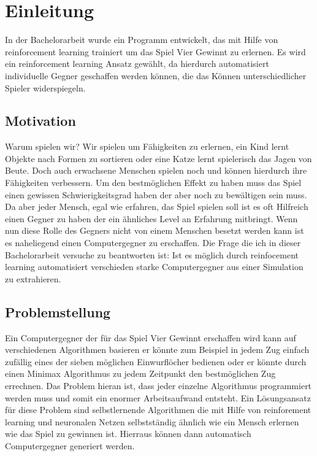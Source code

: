 \chapter{Einleitung}
\label{cha:Einleitung}

In der Bachelorarbeit wurde ein Programm entwickelt, das mit Hilfe von reinforcement learning trainiert um das Spiel Vier Gewinnt zu erlernen. 
Es wird ein reinforcement learning Ansatz gewählt, da hierdurch automatisiert individuelle Gegner geschaffen werden können, die das Können unterschiedlicher Spieler widerspiegeln.%


\section{Motivation}
Warum spielen wir? Wir spielen um Fähigkeiten zu erlernen, ein Kind lernt Objekte nach Formen zu sortieren oder eine Katze lernt spielerisch das Jagen von Beute. Doch auch erwachsene Menschen spielen noch und können hierdurch ihre Fähigkeiten verbessern.  Um den bestmöglichen Effekt zu haben muss das Spiel einen gewissen Schwierigkeitsgrad haben der aber noch zu bewältigen sein muss. Da aber jeder Mensch, egal wie erfahren, das Spiel spielen soll ist es oft Hilfreich einen Gegner zu haben der ein ähnliches Level an Erfahrung mitbringt. Wenn nun diese Rolle des Gegners nicht von einem Menschen besetzt werden kann ist es naheliegend einen Computergegner zu erschaffen. Die Frage die ich in dieser Bachelorarbeit versuche zu beantworten ist: Ist es möglich durch reinfocement learning automatisiert verschieden starke Computergegner aus einer Simulation zu extrahieren.


\section{Problemstellung}
Ein Computergegner der für das Spiel Vier Gewinnt erschaffen wird kann auf verschiedenen Algorithmen basieren er könnte zum Beispiel in jedem Zug einfach zufällig eines der sieben möglichen Einwurflöcher bedienen oder er könnte durch einen Minimax Algorithmus zu jedem Zeitpunkt den bestmöglichen Zug errechnen. 
Das Problem hieran ist, dass jeder einzelne Algorithmus programmiert werden muss und somit ein enormer Arbeitsaufwand entsteht.
Ein Lösungsansatz für diese Problem sind selbstlernende Algorithmen die mit Hilfe von reinforement learning und neuronalen Netzen selbstständig ähnlich wie ein Mensch erlernen wie das Spiel zu gewinnen ist. Hierraus können dann automatisch Computergegner generiert werden. 

